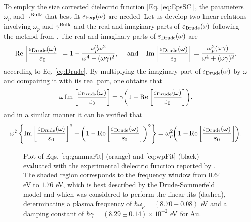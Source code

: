 To employ the size corrected dielectric function [Eq. \eqref{eq:EpsSC}], the parameters  $\omega_p$ and $\gamma^\text{\scriptsize Bulk}$ that best fit  $\varepsilon_\text{\scriptsize Exp}(\omega)$ are needed. Let us develop two linear relations involving $\omega_p$ and $\gamma^\text{\scriptsize Bulk}$ and the real and imaginary parts of $\varepsilon_\text{\scriptsize Drude}(\omega)$ following the method from \citeauthor{mendoza_herrera_determination_2014}. The real and imaginary parts of $\varepsilon_\text{\scriptsize Drude}(\omega)$ are
%
\begin{align}
\Re\qty[\frac{\varepsilon_\text{\scriptsize Drude}(\omega)}{\varepsilon_0}] = 1 - \frac{\omega_p^2 \omega^2}{\omega^4 + (\omega\gamma)^2},
\qqtext{ and}
\Im\qty[\frac{\varepsilon_\text{\scriptsize Drude}(\omega)}{\varepsilon_0}]  = \frac{\omega_p^2  (\omega\gamma)}{\omega^4 + (\omega\gamma)^2}.
\end{align}
%
according to Eq. \eqref{eq:Drude}. By multiplying the imaginary part of $\varepsilon_\text{\scriptsize Drude}(\omega)$ by $\omega$ and compairing it with its real part, one obtains that
%
\begin{align}
\omega \Im\qty[\frac{\varepsilon_\text{\scriptsize Drude}(\omega)}{\varepsilon_0}] =
 \gamma \qty(1 - \Re\qty[\frac{\varepsilon_\text{\scriptsize Drude}(\omega)}{\varepsilon_0}]),
\label{eq:gammaFit}
\end{align}
%
and in a similar manner it can be verified that
\begin{align}
\omega^2\left\{ \Im\qty[\frac{\varepsilon_\text{\scriptsize Drude}(\omega)}{\varepsilon_0}]^2
			+ \qty(1-\Re\qty[\frac{\varepsilon_\text{\scriptsize Drude}(\omega)}{\varepsilon_0}])^2 \right\}
 = \omega_p^2 \qty(1 - \Re\qty[\frac{\varepsilon_\text{\scriptsize Drude}(\omega)}{\varepsilon_0}]).
 \label{eq:wpFit}
\end{align}
	\begin{figure}[b!]
	\def\svgwidth{.85\textwidth} \small\centering
	\caption[Plasma frequency and damping constant determination for Au]{Plot of Eqs. \eqref{eq:gammaFit} (orange) and \eqref{eq:wpFit} (black) evaluated with the experimental dielectric function reported by \citeauthor{johnson_optical_1972} \cite{johnson_optical_1972}. The shaded region corresponds to the frequency window from $0.64$ eV to $1.76$ eV, which is best described by the Drude-Sommerfeld model and which was considered to perform the linear fits (dashed), determinating a plasma frequency of $\hbar\omega_p =(8.70\pm0.08)$ eV and a damping constant of $\hbar\gamma = (8.29 \pm 0.14)\times 10^{-2}$ eV for Au. }
	\label{fig:DrudeFit}
	\end{figure}
